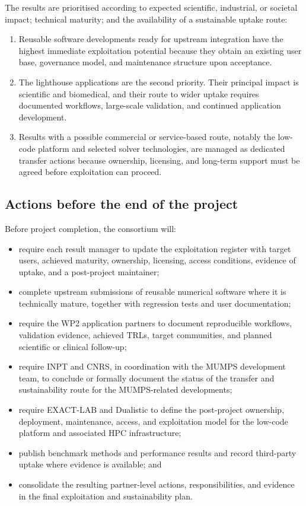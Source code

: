 \documentclass[a4paper,12pt]{article}
\begin{document}
The results are prioritised according to expected scientific, industrial, or
societal impact; technical maturity; and the availability of a sustainable
uptake route:
\begin{enumerate}
  \item Reusable software developments ready for upstream integration have the
  highest immediate exploitation potential because they obtain an existing
  user base, governance model, and maintenance structure upon acceptance.
  \item The lighthouse applications are the second priority. Their principal
  impact is scientific and biomedical, and their route to wider uptake
  requires documented workflows, large-scale validation, and continued
  application development.
  \item Results with a possible commercial or service-based route, notably the
  low-code platform and selected solver technologies, are managed as dedicated
  transfer actions because ownership, licensing, and long-term support must be
  agreed before exploitation can proceed.
\end{enumerate}

\subsection{Actions before the end of the project}

Before project completion, the consortium will:
\begin{itemize}
  \item require each result manager to update the exploitation register with
  target users, achieved maturity, ownership, licensing, access conditions,
  evidence of uptake, and a post-project maintainer;
  \item complete upstream submissions of reusable numerical software where it
  is technically mature, together with regression tests and user
  documentation;
  \item require the WP2 application partners to document reproducible
  workflows, validation evidence, achieved TRLs, target communities, and
  planned scientific or clinical follow-up;
  \item require INPT and CNRS, in coordination with the MUMPS development
  team, to conclude or formally document the status of the transfer and
  sustainability route for the MUMPS-related developments;
  \item require EXACT-LAB and Dualistic to define the post-project ownership,
  deployment, maintenance, access, and exploitation model for the low-code
  platform and associated HPC infrastructure;
  \item publish benchmark methods and performance results and record
  third-party uptake where evidence is available; and
  \item consolidate the resulting partner-level actions, responsibilities, and
  evidence in the final exploitation and sustainability plan.
\end{itemize}
\end{document}
